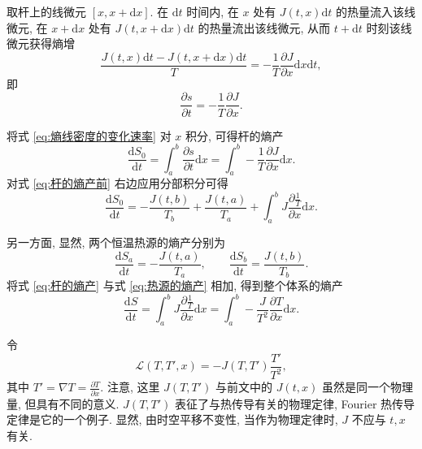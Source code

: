 \documentclass{article}
\begin{document}
\begin{enumerate}
取杆上的线微元 $\left[x,x+\mathrm dx\right]$.
在 $\mathrm dt$ 时间内, 在 $x$ 处有 $J\left(t,x\right)\mathrm dt$ 的热量流入该线微元,
在 $x+\mathrm dx$ 处有 $J\left(t,x+\mathrm dx\right)\mathrm dt$ 的热量流出该线微元,
从而 $t+\mathrm dt$ 时刻该线微元获得熵增
\begin{equation}
	\frac{J\left(t,x\right)\mathrm dt-J\left(t,x+\mathrm dx\right)\mathrm dt}{T}=-\frac1T\frac{\partial J}{\partial x}\mathrm dx\mathrm dt,
\end{equation}
即
\begin{equation}
	\frac{\partial s}{\partial t}=-\frac1T\frac{\partial J}{\partial x}.
	\label{eq:熵线密度的变化速率}
\end{equation}

将式 \ref{eq:熵线密度的变化速率} 对 $x$ 积分, 可得杆的熵产
\begin{equation}
	\frac{\mathrm dS_0}{\mathrm dt}=\int_a^b\frac{\partial s}{\partial t}\mathrm dx=\int_a^b-\frac1T\frac{\partial J}{\partial x}\mathrm dx.
	\label{eq:杆的熵产前}
\end{equation}
对式 \ref{eq:杆的熵产前} 右边应用分部积分可得
\begin{equation}
	\frac{\mathrm dS_0}{\mathrm dt}=-\frac{J\left(t,b\right)}{T_b}+\frac{J\left(t,a\right)}{T_a}+\int_a^bJ\frac{\partial\frac1T}{\partial x}\mathrm dx.
	\label{eq:杆的熵产}
\end{equation}

另一方面, 显然, 两个恒温热源的熵产分别为
\begin{equation}
	\frac{\mathrm dS_a}{\mathrm dt}=-\frac{J\left(t,a\right)}{T_a},\qquad
	\frac{\mathrm dS_b}{\mathrm dt}=\frac{J\left(t,b\right)}{T_b}.
	\label{eq:热源的熵产}
\end{equation}
将式 \ref{eq:杆的熵产} 与式 \ref{eq:热源的熵产} 相加, 得到整个体系的熵产
\begin{equation}
	\frac{\mathrm dS}{\mathrm dt}=\int_a^bJ\frac{\partial\frac1T}{\partial x}\mathrm dx=\int_a^b-\frac{J}{T^2}\frac{\partial T}{\partial x}\mathrm dx.
	\label{eq:整个体系的熵产}
\end{equation}

令
\begin{equation}
	\mathcal L\left(T,T',x\right)=-J\left(T,T'\right)\frac{T'}{T^2},
	\label{eq:lagrangian}
\end{equation}
其中 $T'=\nabla T=\frac{\partial T}{\partial x}$.
注意, 这里 $J\left(T,T'\right)$ 与前文中的 $J\left(t,x\right)$ 虽然是同一个物理量, 但具有不同的意义.
$J\left(T,T'\right)$ 表征了与热传导有关的物理定律, Fourier 热传导定律是它的一个例子.
显然, 由时空平移不变性, 当作为物理定律时, $J$ 不应与 $t,x$ 有关.


\end{enumerate}
\end{document}
